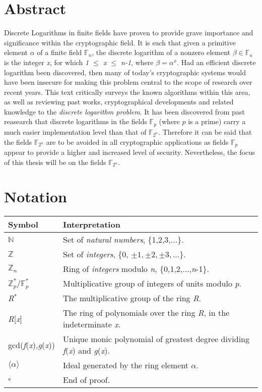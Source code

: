 \documentclass[iwp,first]{luthesis}
\begin{document}
\chapter{Abstract}

Discrete Logarithms in finite fields have proven to provide grave importance and significance within the cryptographic field. It is such that given a primitive element $\alpha$ of a finite field $\mathbb{F}_n$, the discrete logarithm of a nonzero element $\beta\in\mathbb{F}_n$ is the integer \textit{x}, for which \textit{1 $\leq$ x $\leq$ n-1}, where $\beta=\alpha^x$. Had an efficient discrete logarithm been discovered, then many of today's cryptographic systems would have been insecure for making this problem central to the scope of research over recent years. This text critically surveys the known algorithms within this area, as well as reviewing past works, cryptographical developments and related knowledge to the \textit{discrete logarithm problem}. It has been discovered from past reasearch that discrete logarithms in the fields $\mathbb{F}_p$ (where $p$ is a prime) carry a much easier implementation level than that of $\mathbb{F}_{2^n}$. Therefore it can be said that the fields $\mathbb{F}_{2^n}$ are to be avoided in all cryptographic applications as fields $\mathbb{F}_{p}$ appear to provide a higher and increased level of security. Nevertheless, the focus of this thesis will be on the fields $\mathbb{F}_{2^n}$.

\chapter{Notation}

\begin{table}[ht]
\begin{tabular}{|p{2.5cm}|p{10cm}|}
\hline\hline
Symbol & Interpretation\\ [1ex]
\hline
$\mathbb{N}$& Set of \textit{natural numbers}, \{1,2,3,...\}.\\\hline 
$\mathbb{Z}$& Set of \textit{integers}, \{0, $\pm1, \pm2, \pm3,...$\}. \\\hline
$\mathbb{Z}_n$& Ring of \textit{integers} modulo \textit{n}, \{0,1,2,...,\textit{n}-1\}. \\\hline
$\mathbb{Z}^{*}_{p}/\mathbb{F}^{*}_{p}$& Multiplicative group of integers of units modulo \textit{p}. \\\hline
\textit{R$^*$}& The multiplicative group of the ring \textit{R}. \\\hline
\textit{R}[\textit{x}]& The ring of polynomials over the ring \textit{R}, in the indeterminate \textit{x}. \\\hline
gcd(\textit{f}(\textit{x}),\textit{g}(\textit{x}))& Unique monic polynomial of greatest degree dividing \textit{f}(\textit{x}) and \textit{g}(\textit{x}). \\\hline
$\langle \alpha \rangle$& Ideal generated by the ring element $\alpha$. \\\hline
$\square$& End of proof. \\\hline	
\end{tabular}
\label{table:nonlin}
\end{table}
\end{document}
